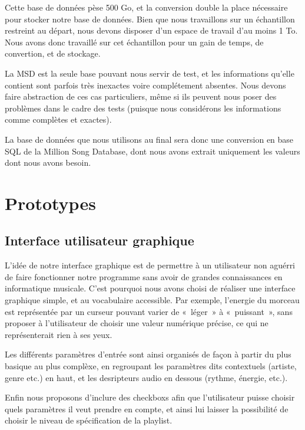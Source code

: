 Cette base de données pèse 500 Go, et la conversion double la place nécessaire 
pour stocker notre base de données. Bien que nous travaillons sur un 
échantillon restreint au départ, nous devons disposer d’un espace de travail 
d’au moins 1 To. Nous avons donc travaillé sur cet échantillon pour un gain de 
temps, de convertion, et de stockage.

La MSD est la seule base pouvant nous servir de test, et les informations 
qu'elle contient sont parfois très inexactes voire complétement absentes. Nous 
devons faire abstraction de ces cas particuliers, même si ils peuvent nous 
poser des problèmes dans le cadre des tests (puisque nous considérons les 
informations comme complètes et exactes).

La base de données que nous utilisons au final sera donc une conversion en base 
SQL de la Million Song Database, dont nous avons extrait uniquement les valeurs 
dont nous avons besoin.

\section{Prototypes}
\label{besoins:proto}

\subsection{Interface utilisateur graphique}
\label{besoins:proto:gui}
    
L'idée de notre interface graphique est de permettre à un utilisateur non aguérri
de faire fonctionner notre programme sans avoir de grandes connaissances en
informatique musicale. C'est pourquoi nous avons choisi de réaliser une interface
graphique simple, et au vocabulaire accessible. Par exemple, l'energie du morceau
est représentée par un curseur pouvant varier de «~léger~» à «~puissant~», sans
proposer à l'utilisateur de choisir une valeur numérique précise, ce qui ne
représenterait rien à ses yeux.
    
Les différents paramètres d'entrée sont ainsi organisés de façon à partir du plus
basique au plus complèxe, en regroupant les paramètres dits contextuels (artiste,
genre etc.) en haut, et les desripteurs audio en dessous (rythme, énergie, etc.).

Enfin nous proposons d'inclure des checkboxs afin que l'utilisateur puisse
choisir quels paramètres il veut prendre en compte, et ainsi lui laisser
la possibilité de choisir le niveau de spécification de la playlist.
    
